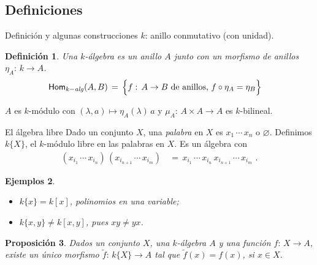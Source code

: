 \theoremstyle{plain}
\newtheorem{defAlgebra}{Definici\'{o}n}[section]
\newtheorem{ejemploLibre}[defAlgebra]{Ejemplos}
\newtheorem{propoLibre}[defAlgebra]{Proposici\'{o}n}
\newtheorem{ejemploCocienteDeLibre}[defAlgebra]{Ejemplo}
\newtheorem{propoRectaAfin}[defAlgebra]{Proposici\'{o}n}
\newtheorem{propoMultiplicativo}[defAlgebra]{Proposici\'{o}n}
\newtheorem{coroMultiplicativo}[defAlgebra]{Corolario}
\newtheorem{propoProductoDeMatrices}[defAlgebra]{Proposici\'{o}n}
\newtheorem{obsProductoDeMatrices}[defAlgebra]{Observaci\'{o}n}
\newtheorem{propoLinealGeneral}[defAlgebra]{Proposici\'{o}n}
\newtheorem{propoProductoTensorial}[defAlgebra]{Proposici\'{o}n}
\newtheorem{propoProductoDeCociente}[defAlgebra]{Proposici\'{o}n}
\newtheorem{obsRectaAfinAbeliana}[defAlgebra]{Observaci\'{o}n}



\subsection{Definiciones}

\begin{frame}{Definici\'{o}n y algunas construcciones}
	$k$: anillo conmutativo (con unidad).

	\begin{defAlgebra}\label{def:algebra}
		Una $k$-\'{a}lgebra es un anillo $A$ junto con un morfismo de
		anillos $\eta_A:\,k\rightarrow A$.
		\begin{align*}
			\mathsf{Hom}_{k-\mathit{alg}}(A,B) & \,=\,
				\Big\{f:\,A\rightarrow B
				\text{ de anillos, } f\circ\eta_A=\eta_B
				\Big\}
		\end{align*}
	\end{defAlgebra}
	$A$ es $k$-m\'{o}dulo con $(\lambda,a)\mapsto\eta_A(\lambda)\,a$ y
	$\mu_A:\,A\times A\rightarrow A$ es $k$-bilineal.
\end{frame}

\begin{frame}{El \'{a}lgebra libre}
	Dado un conjunto $X$, una \emph{palabra} en $X$ es $x_1\,\cdots\,x_n$ o
	$\varnothing$. Definimos $k\{X\}$, el $k$-m\'{o}dulo libre en las
	palabras en $X$. Es un \'{a}lgebra con
	\begin{align*}
		(x_{i_1}\,\cdots\,x_{i_n})\,(x_{i_{n+1}}\,\cdots\,x_{i_m})
			& \,=\,x_{i_1}\,\cdots\,x_{i_n}\,x_{i_{n+1}}\,\cdots\,
				x_{i_m}
		\text{ .}
	\end{align*}
	\begin{ejemploLibre}\label{ejemplo:libre}
		\begin{itemize}
			\item $k\{x\}=k[x]$, polinomios en una variable;
			\item $k\{x,y\}\not=k[x,y]$, pues $xy\not=yx$.
		\end{itemize}
	\end{ejemploLibre}
	\begin{propoLibre}\label{propo:libre}
		Dados un conjunto $X$, una $k$-\'{a}lgebra $A$ y una
		\emph{funci\'{o}n} $f:\,X\rightarrow A$, existe un \'{u}nico
		morfismo $\tilde f:\,k\{X\}\rightarrow A$ tal que
		$\tilde f(x)=f(x)$, si $x\in X$.
	\end{propoLibre}
\end{frame}


